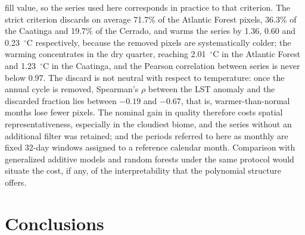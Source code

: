 \documentclass[a4paper,fleqn]{cas-sc}
\begin{document}
fill value, so the series used here corresponds in practice to that criterion. The strict criterion discards on average 71.7\% of the Atlantic Forest pixels, 36.3\% of the Caatinga and 19.7\% of the Cerrado, and warms the series by 1.36, 0.60 and 0.23~$^{\circ}$C respectively, because the removed pixels are systematically colder; the warming concentrates in the dry quarter, reaching 2.01~$^{\circ}$C in the Atlantic Forest and 1.23~$^{\circ}$C in the Caatinga, and the Pearson correlation between series is never below 0.97. The discard is not neutral with respect to temperature: once the annual cycle is removed, Spearman's $\rho$ between the LST anomaly and the discarded fraction lies between $-0.19$ and $-0.67$, that is, warmer-than-normal months lose fewer pixels. The nominal gain in quality therefore costs spatial representativeness, especially in the cloudiest biome, and the series without an additional filter was retained; and the periods referred to here as monthly are fixed 32-day windows assigned to a reference calendar month. Comparison with generalized additive models and random forests under the same protocol would situate the cost, if any, of the interpretability that the polynomial structure offers.

\section{Conclusions}\label{sec:conclusions}
\end{document}
